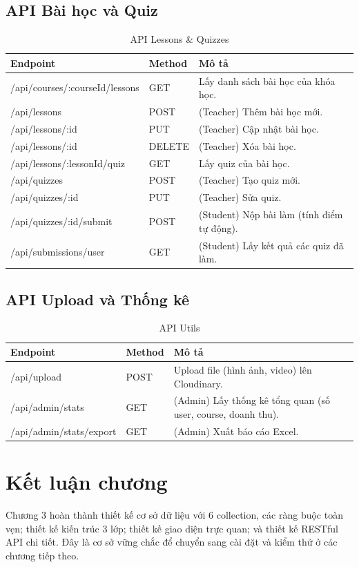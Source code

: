 \subsection{API Bài học và Quiz}
\begin{table}[H]
\centering
\caption{API Lessons \& Quizzes}
\begin{tabular}{|p{3cm}|p{2.5cm}|p{7cm}|}
\hline
\textbf{Endpoint} & \textbf{Method} & \textbf{Mô tả} \\ \hline
/api/courses/:courseId/lessons & GET & Lấy danh sách bài học của khóa học. \\ \hline
/api/lessons & POST & (Teacher) Thêm bài học mới. \\ \hline
/api/lessons/:id & PUT & (Teacher) Cập nhật bài học. \\ \hline
/api/lessons/:id & DELETE & (Teacher) Xóa bài học. \\ \hline
/api/lessons/:lessonId/quiz & GET & Lấy quiz của bài học. \\ \hline
/api/quizzes & POST & (Teacher) Tạo quiz mới. \\ \hline
/api/quizzes/:id & PUT & (Teacher) Sửa quiz. \\ \hline
/api/quizzes/:id/submit & POST & (Student) Nộp bài làm (tính điểm tự động). \\ \hline
/api/submissions/user & GET & (Student) Lấy kết quả các quiz đã làm. \\ \hline
\end{tabular}
\end{table}

\subsection{API Upload và Thống kê}
\begin{table}[H]
\centering
\caption{API Utils}
\begin{tabular}{|p{3cm}|p{2.5cm}|p{7cm}|}
\hline
\textbf{Endpoint} & \textbf{Method} & \textbf{Mô tả} \\ \hline
/api/upload & POST & Upload file (hình ảnh, video) lên Cloudinary. \\ \hline
/api/admin/stats & GET & (Admin) Lấy thống kê tổng quan (số user, course, doanh thu). \\ \hline
/api/admin/stats/export & GET & (Admin) Xuất báo cáo Excel. \\ \hline
\end{tabular}
\end{table}

\section{Kết luận chương}
Chương 3 hoàn thành thiết kế cơ sở dữ liệu với 6 collection, các ràng buộc toàn vẹn; thiết kế kiến trúc 3 lớp; thiết kế giao diện trực quan; và thiết kế RESTful API chi tiết. Đây là cơ sở vững chắc để chuyển sang cài đặt và kiểm thử ở các chương tiếp theo.
